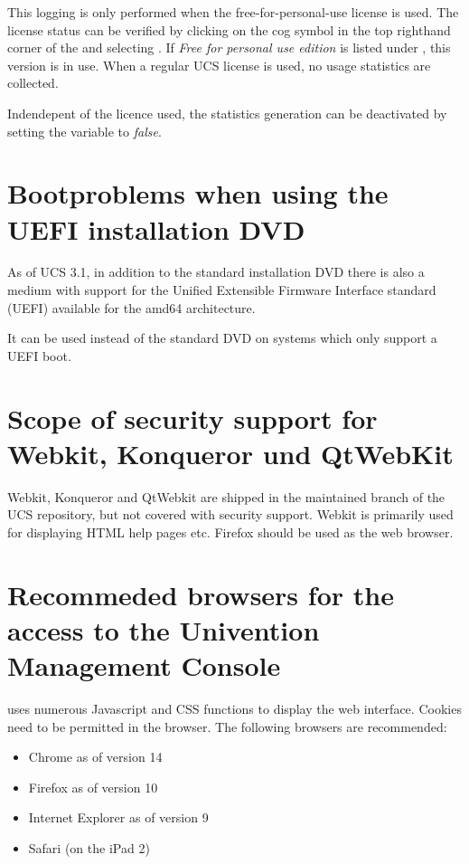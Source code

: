 This logging is only performed when the free-for-personal-use license
is used. The license status can be verified by clicking on the cog
symbol in the top righthand corner of the \ucsUMC{} and
selecting . If \emph{Free for personal use
edition} is listed under , this version is in
use. When a regular UCS license is used, no usage statistics are
collected.

Indendepent of the licence used, the statistics generation can be
deactivated by setting the \ucsUCR{} variable  to \emph{false}.

\section{Bootproblems when using the UEFI installation DVD}
As of UCS 3.1, in addition to the standard installation DVD there is
also a medium with support for the Unified Extensible Firmware
Interface standard (UEFI) available for the amd64 architecture.

It can be used instead of the standard DVD on systems which only
support a UEFI boot.

\section{Scope of security support for Webkit, Konqueror und QtWebKit}
Webkit, Konqueror and QtWebkit are shipped in the maintained branch of
the UCS repository, but not covered with security support. Webkit is
primarily used for displaying HTML help pages etc. Firefox should be
used as the web browser.

\section{Recommeded browsers for the access to the Univention Management Console}

\ucsUMC{} uses numerous Javascript and CSS functions to display the
web interface. Cookies need to be permitted in the browser.
The following browsers are recommended:

\begin{itemize}
\item Chrome as of version 14
\item Firefox as of version 10
\item Internet Explorer as of version 9
\item Safari (on the iPad 2)
\end{itemize}

